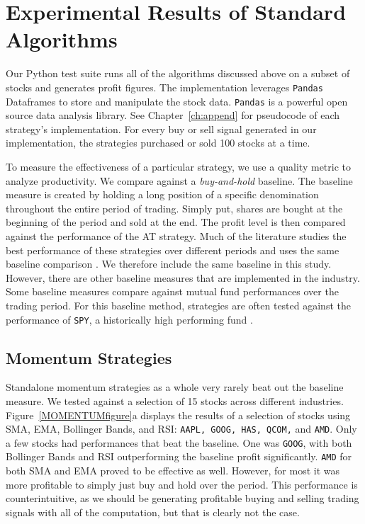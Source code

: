 \documentclass[../thesis.tex]{subfiles}
\begin{document}
\chapter{Experimental Results of Standard Algorithms}
\label{ch:experimentsalgos}

Our Python test suite runs all of the algorithms discussed above on a subset of stocks and generates profit figures. The implementation leverages \texttt{Pandas} Dataframes to store and manipulate the stock data. \texttt{Pandas} is a powerful open source data analysis library. See Chapter~\ref{ch:append} for pseudocode of each strategy's implementation. For every buy or sell signal generated in our implementation, the strategies purchased or sold 100 stocks at a time.

To measure the effectiveness of a particular strategy, we use a quality metric to analyze productivity. We compare against a \textit {buy-and-hold} baseline. The baseline measure is created by holding a long position of a specific denomination throughout the entire period of trading. Simply put, shares are bought at the beginning of the period and sold at the end. The profit level is then compared against the performance of the AT strategy. Much of the literature studies the best performance of these strategies over different periods and uses the same baseline comparison \cite{Liu2006} \cite{Aldridge2010} \cite{Garcia2015}. We therefore include the same baseline in this study. However, there are other baseline measures that are implemented in the industry. Some baseline measures compare against mutual fund performances over the trading period. For this baseline method, strategies are often tested against the performance of \texttt{SPY}, a historically high performing fund \cite{Aldridge2010}.

\section{Momentum Strategies}
\label{momentumstrats}

Standalone momentum strategies as a whole very rarely beat out the baseline measure. We tested against a selection of 15 stocks across different industries. Figure~\ref{MOMENTUMfigure}a displays the results of a selection of stocks using SMA, EMA, Bollinger Bands, and RSI: \texttt{AAPL, GOOG, HAS, QCOM,} and \texttt{AMD}. Only a few stocks had performances that beat the baseline. One was \texttt{GOOG}, with both Bollinger Bands and RSI outperforming the baseline profit significantly. \texttt{AMD} for both SMA and EMA proved to be effective as well. However, for most it was more profitable to simply just buy and hold over the period. This performance is counterintuitive, as we should be generating profitable buying and selling trading signals with all of the computation, but that is clearly not the case.  
\end{document}
